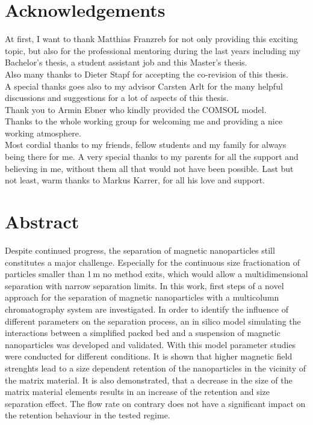 \chapter*{Acknowledgements}

At first, I want to thank Matthias Franzreb for not only providing this exciting topic, but also for the professional mentoring during the last years including my Bachelor’s thesis, a student assistant job and this Master’s thesis.\newline \\
Also many thanks to Dieter Stapf for accepting the co-revision of this thesis.\newline \\
A special thanks goes also to my advisor Carsten Arlt for the many helpful discussions and suggestions for a lot of aspects of this thesis.\newline \\
Thank you to Armin Ebner who kindly provided the COMSOL model.\newline \\
Thanks to the whole working group for welcoming me and providing a nice working  atmosphere.\newline \\
Most cordial thanks to my friends, fellow students and my family for always being there for me. A very special thanks to my parents for all the support and believing in me, without them all that would not have been possible. Last but not least, warm thanks to Markus Karrer, for all his love and support.

\newpage

\chapter{Abstract}
\label{ch:abstract_en}

Despite continued progress, the separation of magnetic nanoparticles still constitutes a major challenge. Especially for the continuous size fractionation of particles smaller than 1\,\textmu m no method exits, which would allow a multidimensional separation with narrow separation limits. In this work, first steps of a novel approach for the separation of magnetic nanoparticles with a multicolumn chromatography system are investigated. In order to identify the influence of different parameters on the separation process, an in silico model simulating the interactions between a simplified packed bed and a suspension of magnetic nanoparticles was developed and validated. With this model parameter studies were conducted for different conditions. It is shown that higher magnetic field strenghts lead to a size dependent retention of the nanoparticles in the vicinity of the matrix material. It is also demonstrated, that a decrease in the size of the matrix material elements results in an increase of the retention and size separation effect. The flow rate on contrary does not have a significant impact on the retention behaviour in the tested regime.  

